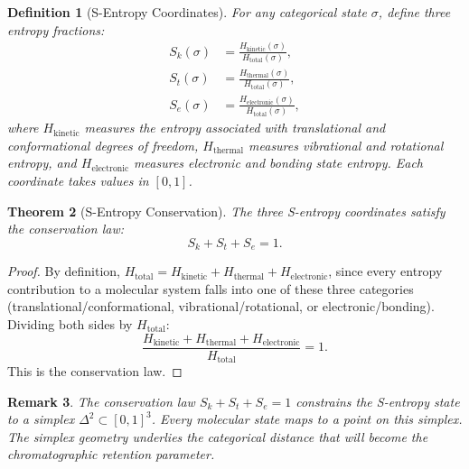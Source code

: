 \documentclass[11pt,twocolumn,a4paper]{article}
\newtheorem{theorem}{Theorem}[section]
\newtheorem{definition}[theorem]{Definition}
\newtheorem{remark}[theorem]{Remark}
\newcommand{\Sk}{S_k}
\newcommand{\St}{S_t}
\newcommand{\Se}{S_e}
\begin{document}
\begin{definition}[S-Entropy Coordinates]
\label{def:s-entropy-coords}
For any categorical state $\sigma$, define three entropy fractions:
\begin{align}
\Sk(\sigma) &= \frac{H_{\mathrm{kinetic}}(\sigma)}{H_{\mathrm{total}}(\sigma)}, \label{eq:sk} \\
\St(\sigma) &= \frac{H_{\mathrm{thermal}}(\sigma)}{H_{\mathrm{total}}(\sigma)}, \label{eq:st} \\
\Se(\sigma) &= \frac{H_{\mathrm{electronic}}(\sigma)}{H_{\mathrm{total}}(\sigma)}, \label{eq:se}
\end{align}
where $H_{\mathrm{kinetic}}$ measures the entropy associated with
translational and conformational degrees of freedom,
$H_{\mathrm{thermal}}$ measures vibrational and rotational entropy,
and $H_{\mathrm{electronic}}$ measures electronic and bonding state
entropy. Each coordinate takes values in $[0,1]$.
\end{definition}

\begin{theorem}[S-Entropy Conservation]
\label{thm:s-entropy-conservation}
The three S-entropy coordinates satisfy the conservation law:
\begin{equation}
\Sk + \St + \Se = 1.
\label{eq:s-conservation}
\end{equation}
\end{theorem}

\begin{proof}
By definition, $H_{\mathrm{total}} = H_{\mathrm{kinetic}} +
H_{\mathrm{thermal}} + H_{\mathrm{electronic}}$, since every entropy
contribution to a molecular system falls into one of these three
categories (translational/conformational, vibrational/rotational, or
electronic/bonding). Dividing both sides by $H_{\mathrm{total}}$:
\begin{equation}
\frac{H_{\mathrm{kinetic}} + H_{\mathrm{thermal}} + H_{\mathrm{electronic}}}{H_{\mathrm{total}}} = 1.
\end{equation}
This is the conservation law.
\end{proof}

\begin{remark}
The conservation law $\Sk + \St + \Se = 1$ constrains the S-entropy
state to a simplex $\Delta^2 \subset [0,1]^3$. Every molecular state
maps to a point on this simplex. The simplex geometry underlies the
categorical distance that will become the chromatographic retention
parameter.
\end{remark}
\end{document}

